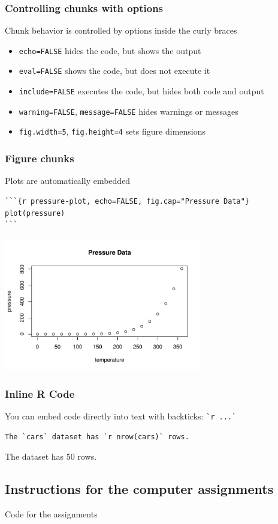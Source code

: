 \documentclass[aspectratio=169]{beamer}\usepackage[]{graphicx}\usepackage[]{xcolor}
\newenvironment{knitrout}{}{} %
\begin{document}
\begin{frame}[fragile]
  \frametitle{Controlling chunks with options}
  Chunk behavior is controlled by options inside the curly braces
  \vfill
  \begin{itemize}
    \item \verb|echo=FALSE| hides the  code, but shows the output
    \vfill
    \item \verb|eval=FALSE| shows the code, but does not execute it
    \vfill
    \item \verb|include=FALSE| executes the code, but hides both code and output
    \vfill
    \item \verb|warning=FALSE|, \verb|message=FALSE| hides warnings or messages
    \vfill
    \item \verb|fig.width=5|, \verb|fig.height=4| sets figure dimensions
  \end{itemize}
\end{frame}

\begin{frame}[fragile]
  \frametitle{Figure chunks}
  Plots are automatically embedded
\begin{lstlisting}
```{r pressure-plot, echo=FALSE, fig.cap="Pressure Data"}
plot(pressure)
```
\end{lstlisting}

\begin{center}
\begin{knitrout}
\color{fgcolor}
\includegraphics[width=0.65\textwidth]{FIGS/L02-pressure-plot-rmd-1} 
\end{knitrout}
\end{center}
\end{frame}

\begin{frame}[fragile]
  \frametitle{Inline R Code}
  You can embed  code directly into text with backticks: \verb|`r ...`|
  \vfill
\begin{lstlisting}
The `cars` dataset has `r nrow(cars)` rows.
\end{lstlisting}
  \vfill
  The  dataset has 50 rows.
\end{frame}

\subsection{Instructions for the computer assignments}



\begin{frame}{Code for the assignments}
\end{frame}
\end{document}
